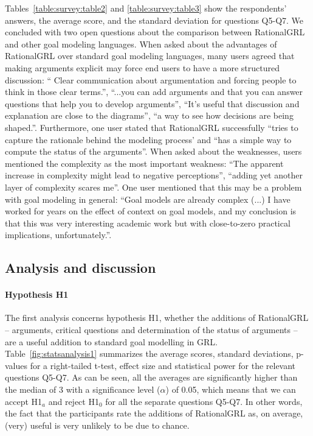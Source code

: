 Tables~\ref{table:survey:table2} and \ref{table:survey:table3} show the respondents' answers, the average score, and the standard deviation for questions Q5-Q7. We concluded with two open questions about the comparison between RationalGRL and other goal modeling languages. When asked about the advantages of RationalGRL over standard goal modeling languages, many users agreed that making arguments explicit may force end users to have a more structured discussion: ``	Clear communication about argumentation and forcing people to think in those clear terms.'', ``...you can add arguments and that you can answer questions that help you to develop arguments'', ``It's useful that discussion and explanation are close to the diagrams'', ``a way to see how decisions are being shaped.''. Furthermore, one user stated that RationalGRL successfully ``tries to capture the rationale behind the modeling process' and ``has a simple way to compute the status of the arguments''. When asked about the weaknesses, users mentioned the complexity as the most important weakness: ``The apparent increase in complexity might lead to negative perceptions'', ``adding yet another layer of complexity scares me''. One user mentioned that this may be a problem with goal modeling in general: ``Goal models are already complex (...) I have worked for years on the effect of context on goal models, and my conclusion is that this was very interesting academic work but with close-to-zero practical implications, unfortunately.''.

\subsection{Analysis and discussion}

\paragraph{Hypothesis H1}
The first analysis concerns hypothesis H1, whether the additions of RationalGRL -- arguments, critical questions and determination of the status of arguments -- are a useful addition to standard goal modelling in GRL. Table~\ref{fig:statsanalysis1} summarizes the average scores, standard deviations, p-values for a right-tailed t-test, effect size and statistical power for the relevant questions Q5-Q7. As can be seen, all the averages are significantly higher than the median of 3 with a significance level ($\alpha$) of 0.05, which means that we can accept H1$_{a}$ and reject H1$_{0}$ for all the separate questions Q5-Q7. In other words, the fact that the participants rate the additions of RationalGRL as, on average, (very) useful is very unlikely to be due to chance. 

